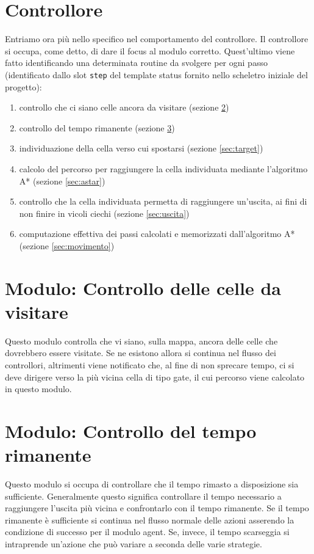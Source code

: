 \section{Controllore} \label{sec:controllore}
Entriamo ora più nello specifico nel comportamento del controllore. Il controllore si occupa, come detto, di dare il focus al modulo corretto. Quest'ultimo viene fatto identificando una determinata routine da svolgere per ogni passo (identificato dallo slot \texttt{step} del template status fornito nello scheletro iniziale del progetto):
\begin{enumerate}
	\item controllo che ci siano celle ancora da visitare (sezione \ref{sec:finish})
	\item controllo del tempo rimanente (sezione \ref{sec:tempo})
	\item individuazione della cella verso cui spostarsi (sezione \ref{sec:target})
	\item calcolo del percorso per raggiungere la cella individuata mediante l'algoritmo A* (sezione \ref{sec:astar})
	\item controllo che la cella individuata permetta di raggiungere un'uscita, ai fini di non finire in vicoli ciechi (sezione \ref{sec:uscita})
	\item computazione effettiva dei passi calcolati e memorizzati dall'algoritmo A* (sezione \ref{sec:movimento})
\end{enumerate}

\section{Modulo: Controllo delle celle da visitare} \label{sec:finish}
Questo modulo controlla che vi siano, sulla mappa, ancora delle celle che dovrebbero essere visitate. Se ne esistono allora si continua nel flusso dei controllori, altrimenti viene notificato che, al fine di non sprecare tempo, ci si deve dirigere verso la più vicina cella di tipo gate, il cui percorso viene calcolato in questo modulo.

\section{Modulo: Controllo del tempo rimanente} \label{sec:tempo}
Questo modulo si occupa di controllare che il tempo rimasto a disposizione sia sufficiente. Generalmente questo significa controllare il tempo necessario a raggiungere l'uscita più vicina e confrontarlo con il tempo rimanente. Se il tempo rimanente è sufficiente si continua nel flusso normale delle azioni asserendo la condizione di successo per il modulo agent. Se, invece, il tempo scarseggia si intraprende un'azione che può variare a seconda delle varie strategie.

